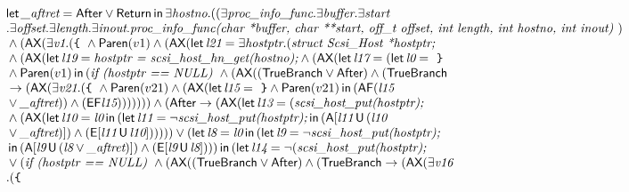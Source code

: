 \documentclass{article}
\newcommand{\U}{\,\mbox{\sf{U}}\,}
\newcommand{\A}{\mbox{\sf{A}}}
\newcommand{\E}{\mbox{\sf{E}}}
\newcommand{\AX}{\mbox{\sf{AX}}}
\newcommand{\AF}{\mbox{\sf{AF}}}
\newcommand{\EF}{\mbox{\sf{EF}}}
\newcommand{\mita}[1]{\mbox{\it{{#1}}}}
\newcommand{\msf}[1]{\mbox{\sf{{#1}}}}
\newcommand{\ttlb}{\mbox{\tt \char'173}}
\newcommand{\ttrb}{\mbox{\tt \char'175}}
\begin{document}
\[\begin{array}{l}
\mita{\sf{let}} \, \mita{\_aftret} = \msf{After} \vee \msf{Return} \, \mita{\sf{in}} \, \exists \mita{hostno} . ((\exists \mita{proc\_info\_func} . \exists \mita{buffer} . \exists \mita{start}\\\mbox{} . \exists \mita{offset} . \exists \mita{length} . \exists \mita{inout} . \mita{proc\_info\_func(char *buffer, char **start, off\_t offset, int length,
               int hostno, int inout) })\\\mbox{} \wedge (\AX(\exists \mita{v1} . (\mita{{\ttlb}
  } \wedge \msf{Paren}(v1) \wedge (\AX(\mita{\sf{let}} \, \mita{l21} = \exists \mita{hostptr} . (\mita{struct Scsi\_Host *hostptr;}\\\mbox{} \wedge (\AX(\mita{\sf{let}} \, \mita{l19} = \mita{hostptr = scsi\_host\_hn\_get(hostno);} \wedge (\AX(\mita{\sf{let}} \, \mita{l17} = (\mita{\sf{let}} \, \mita{l0} = \mita{
{\ttrb}}\\\mbox{} \wedge \msf{Paren}(v1) \, \mita{\sf{in}} \, (\mita{if (hostptr == NULL) } \wedge (\AX((\msf{TrueBranch} \vee \msf{After}) \wedge (\msf{TrueBranch}\\\mbox{} \rightarrow (\AX(\exists \mita{v21} . (\mita{{\ttlb}
  } \wedge \msf{Paren}(v21) \wedge (\AX(\mita{\sf{let}} \, \mita{l15} = \mita{
{\ttrb}} \wedge \msf{Paren}(v21) \, \mita{\sf{in}} \, (\AF(\mita{l15}\\\mbox{} \vee \mita{\_aftret})) \wedge (\EF\mita{l15})
)))))) \wedge (\msf{After} \rightarrow (\AX(\mita{\sf{let}} \, \mita{l13} = (\mita{scsi\_host\_put(hostptr);}\\\mbox{} \wedge (\AX(\mita{\sf{let}} \, \mita{l10} = \mita{l0} \, \mita{\sf{in}} \, (\mita{\sf{let}} \, \mita{l11} = \neg \mita{scsi\_host\_put(hostptr);} \, \mita{\sf{in}} \, (\A[\mita{l11} \U (\mita{l10}\\\mbox{} \vee \mita{\_aftret})]
) \wedge (\E[\mita{l11} \U \mita{l10}]
)
)
))) \vee (\mita{\sf{let}} \, \mita{l8} = \mita{l0} \, \mita{\sf{in}} \, (\mita{\sf{let}} \, \mita{l9} = \neg \mita{scsi\_host\_put(hostptr);}\\\mbox{} \, \mita{\sf{in}} \, (\A[\mita{l9} \U (\mita{l8} \vee \mita{\_aftret})]
) \wedge (\E[\mita{l9} \U \mita{l8}]
)
)
) \, \mita{\sf{in}} \, (\mita{\sf{let}} \, \mita{l14} = \neg (\mita{scsi\_host\_put(hostptr);}\\\mbox{} \vee (\mita{if (hostptr == NULL) } \wedge (\AX((\msf{TrueBranch} \vee \msf{After}) \wedge (\msf{TrueBranch} \rightarrow (\AX(\exists \mita{v16}\\\mbox{} . (\mita{{\ttlb}
}
\end{array}\]
\end{document}
